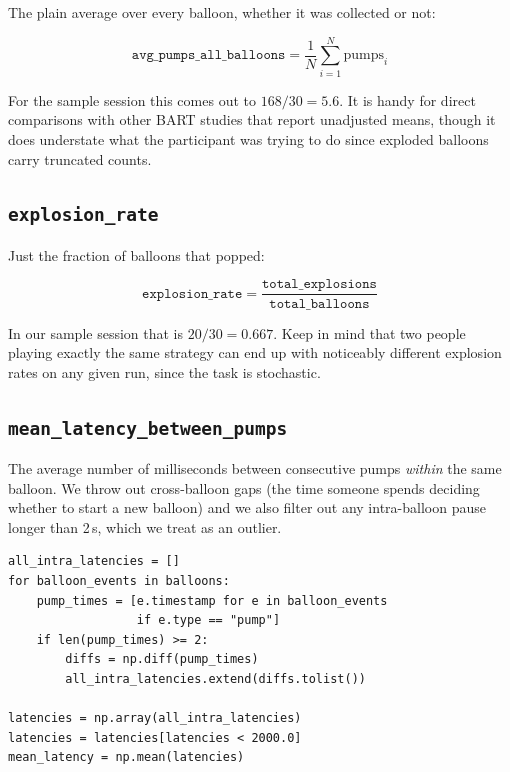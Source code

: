 \documentclass[11pt,a4paper]{article}
\begin{document}
The plain average over every balloon, whether it was collected or not:

\begin{equation}
    \texttt{avg\_pumps\_all\_balloons} = \frac{1}{N}\sum_{i=1}^{N} \text{pumps}_i
\end{equation}

For the sample session this comes out to $168 / 30 = 5.6$. It is handy for
direct comparisons with other BART studies that report unadjusted means, though
it does understate what the participant was trying to do since exploded balloons
carry truncated counts.


\subsection{\texttt{explosion\_rate}}

Just the fraction of balloons that popped:

\begin{equation}
    \texttt{explosion\_rate} = \frac{\texttt{total\_explosions}}{\texttt{total\_balloons}}
\end{equation}

In our sample session that is $20/30 = 0.667$. Keep in mind that two people
playing exactly the same strategy can end up with noticeably different explosion
rates on any given run, since the task is stochastic.


\subsection{\texttt{mean\_latency\_between\_pumps}}

The average number of milliseconds between consecutive pumps \emph{within} the
same balloon. We throw out cross-balloon gaps (the time someone spends deciding
whether to start a new balloon) and we also filter out any intra-balloon pause
longer than 2\,s, which we treat as an outlier.

\begin{lstlisting}[style=pythonstyle]
all_intra_latencies = []
for balloon_events in balloons:
    pump_times = [e.timestamp for e in balloon_events
                  if e.type == "pump"]
    if len(pump_times) >= 2:
        diffs = np.diff(pump_times)
        all_intra_latencies.extend(diffs.tolist())

latencies = np.array(all_intra_latencies)
latencies = latencies[latencies < 2000.0]
mean_latency = np.mean(latencies)
\end{lstlisting}
\end{document}
